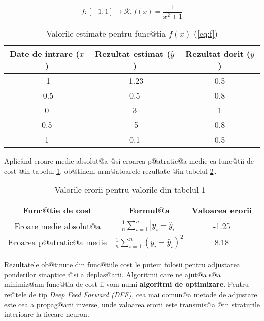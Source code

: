 \begin{equation} \label{eq:f}
	f:[-1, 1]\rightarrow \mathcal{R}, f(x) = \displaystyle\frac{1}{x^2+1}
\end{equation}

\begin{table}[h]
	\begin{center}
		\begin{tabular}{|c|c|c|}
			\hline
			Date de intrare ($x$) & Rezultat estimat ($\hat{y}$) & Rezultat dorit ($y$) \\
			\hline
			-1 & -1.23 & 0.5 \\
			\hline
			-0.5 & 0.5 & 0.8 \\
			\hline
			0 & 3 & 1 \\
			\hline
			0.5 & -5 & 0.8 \\ 
			\hline
			1 & 0.1 & 0.5 \\ 
			\hline
		\end{tabular}
	\end{center}
	\caption{Valorile estimate pentru func@tia $f(x)$ (\ref{eq:f})}
	\label{tab:nn-functie}
\end{table}

Aplic\^ and eroare medie absolut@a @si eroarea p@atratic@a medie ca func@tii de cost @in tabelul \ref{tab:nn-functie}, ob@tinem urm@atoarele rezultate @in tabelul \ref{tab:nn-erori}\,.

\begin{table}[h]
	\begin{center}
		\begin{tabular}{|c|c|c|}
			\hline
			Func@tie de cost & Formul@a & Valoarea erorii \\
			\hline
			Eroare medie absolut@a & $\displaystyle\frac{1}{n} \sum_{i=1}^{n} |y_i - \hat{y}_i| $ & -1.25 \\
			\hline
			Eroarea p@atratic@a medie & $\displaystyle\frac{1}{n} \sum_{i=1}^{n} \left( y_i - \hat{y}_i \right)^2 $ & 8.18 \\
			\hline
		\end{tabular}
	\end{center}
	\caption{Valorile erorii pentru valorile din tabelul \ref{tab:nn-functie}}
	\label{tab:nn-erori}
\end{table}

Rezultatele ob@tinute din func@tiile cost le putem folosii pentru adjustarea ponderilor sinaptice @si a deplas@arii. Algoritmii care ne ajut@a s@a minimiz@am func@tia de cost ii vom numi \textbf{algoritmi de optimizare}. Pentru re@tele de tip \textsl{Deep Feed Forward (DFF)}, cea mai comun@a metode de adjustare este cea a propag@arii inverse, unde valoarea erorii este transmis@a @in straturile interioare la fiecare neuron. 

